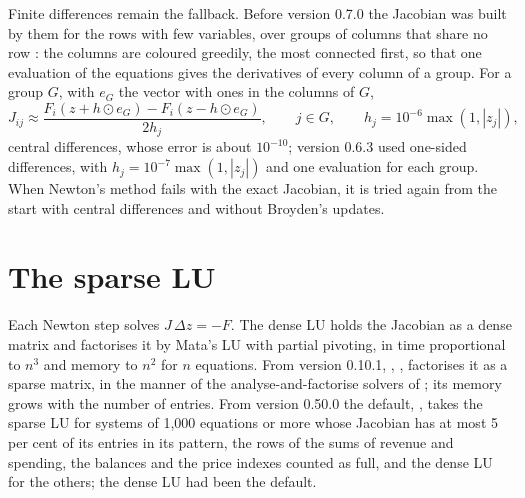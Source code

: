 Finite differences remain the fallback. Before version 0.7.0 the Jacobian
was built by them for the rows with few variables, over groups of columns
that share no row \citep{curtis1974}: the columns are coloured greedily, the
most connected first, so that one evaluation of the equations gives the
derivatives of every column of a group. For a group $G$, with $e_G$ the
vector with ones in the columns of $G$,
\begin{equation*}
J_{ij} \approx \frac{F_i(z + h \odot e_G) - F_i(z - h \odot e_G)}{2 h_j}, \qquad j \in G,
\qquad h_j = 10^{-6} \max(1, |z_j|),
\end{equation*}
central differences, whose error is about $10^{-10}$; version 0.6.3 used
one-sided differences, with $h_j = 10^{-7} \max(1, |z_j|)$ and one
evaluation for each group. When Newton's method fails with the exact
Jacobian, it is tried again from the start with central differences and
without Broyden's updates.

\section{The sparse LU}\label{sec:sparse}

Each Newton step solves $J\,\Delta z = -F$. The dense LU holds the Jacobian
as a dense matrix and factorises it by Mata's LU with partial pivoting, in
time proportional to $n^3$ and memory to $n^2$ for $n$ equations. From version
0.10.1, , , factorises it as a
sparse matrix, in the manner of the analyse-and-factorise solvers of
\citet{duff1986}; its memory grows with the number of entries. From version
0.50.0 the default, , takes the sparse LU for systems of
1,000 equations or more whose Jacobian has at most 5 per cent of its entries
in its pattern, the rows of the sums of revenue and spending, the balances
and the price indexes counted as full, and the dense LU for the others; the
dense LU had been the default.

